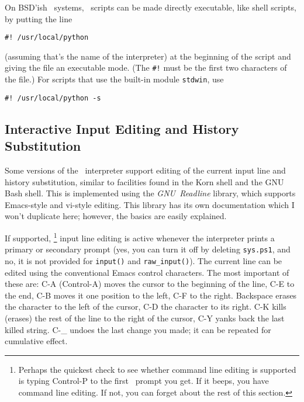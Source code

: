 On BSD'ish \UNIX\ systems, \Python\ scripts can be made directly executable,
like shell scripts, by putting the line
\begin{code}\begin{verbatim}
#! /usr/local/python
\end{verbatim}\end{code}
(assuming that's the name of the interpreter) at the beginning of the
script and giving the file an executable mode.
(The
{\tt \#!}
must be the first two characters of the file.)
For scripts that use the built-in module
{\tt stdwin},
use
\begin{code}\begin{verbatim}
#! /usr/local/python -s
\end{verbatim}\end{code}

\subsection{Interactive Input Editing and History Substitution}

Some versions of the \Python\ interpreter support editing of the current
input line and history substitution, similar to facilities found in the
Korn shell and the GNU Bash shell.
This is implemented using the
{\it GNU\ Readline}
library, which supports Emacs-style and vi-style editing.
This library has its own documentation which I won't duplicate here;
however, the basics are easily explained.

If supported,%
\footnote{
	Perhaps the quickest check to see whether command line editing
	is supported is typing Control-P to the first \Python\ prompt
	you get.  If it beeps, you have command line editing.
	If not, you can forget about the rest of this section.
}
input line editing is active whenever the interpreter prints a primary
or secondary prompt (yes, you can turn it off by deleting
{\tt sys.ps1},
and no, it is not provided for
{\tt input()}
and
{\tt raw\_input()}).
The current line can be edited using the conventional Emacs control
characters.
The most important of these are:
C-A (Control-A) moves the cursor to the beginning of the line, C-E to
the end, C-B moves it one position to the left, C-F to the right.
Backspace erases the character to the left of the cursor, C-D the
character to its right.
C-K kills (erases) the rest of the line to the right of the cursor, C-Y
yanks back the last killed string.
C-\_ undoes the last change you made; it can be repeated for cumulative
effect.

